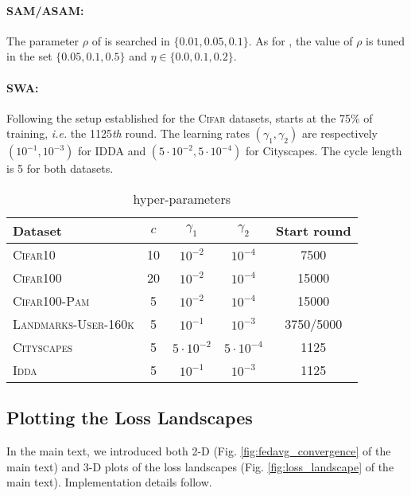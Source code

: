 \paragraph{SAM/ASAM:} The parameter $\rho$ of \sam is searched in $\{0.01,0.05,0.1\}$. As for \asam, the value of $\rho$ is tuned in the set $\{0.05,0.1,0.5\}$ and $\eta\in\{0.0,0.1,0.2\}$.

\paragraph{SWA:} Following the setup established for the \textsc{Cifar} datasets, \swa starts at the 75\% of training, \textit{i.e.} the 1125\textit{th} round. The learning rates $(\gamma_1,\gamma_2)$ are respectively $(10^{-1},10^{-3})$ for IDDA and $(5\cdot10^{-2}, 5\cdot10^{-4})$ for Cityscapes. The cycle length is 5 for both datasets.

\begin{table}[t]\centering
\caption{\swa hyper-parameters}\label{tab:params_swa}
\scriptsize
\setlength\tabcolsep{0.25cm}
    \begin{tabular}{lcccc}
    \toprule
    Dataset & $c$ & $\gamma_1$ & $\gamma_2$ & Start round\\
    \midrule
    \textsc{Cifar10} & 10 & $10^{-2}$ & $10^{-4}$ & 7500\\
    \textsc{Cifar100} & 20 & $10^{-2}$ & $10^{-4}$ & 15000\\
    \textsc{Cifar100-Pam} & 5 & $10^{-2}$ & $10^{-4}$ & 15000\\
    \textsc{Landmarks-User-160k} & 5 & $10^{-1}$ & $10^{-3}$ & 3750/5000\\
    \textsc{Cityscapes} & 5&$5\cdot10^{-2}$& $5\cdot10^{-4}$ & 1125\\
    \textsc{Idda} &5& $10^{-1}$ &$10^{-3}$& 1125\\
    \bottomrule
    \end{tabular}
\end{table}

\subsection{Plotting the Loss Landscapes}
In the main text, we introduced both 2-D (Fig. \ref{fig:fedavg_convergence} of the main text) and 3-D plots of the loss landscapes (Fig. \ref{fig:loss_landscape} of the main text). Implementation details follow.

